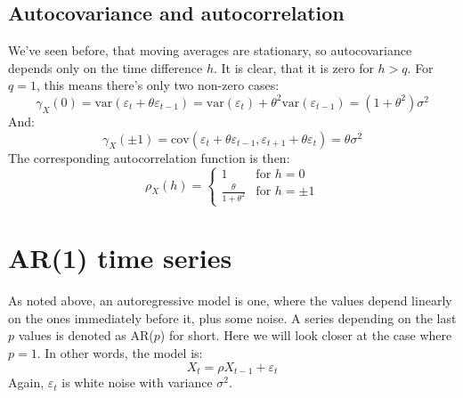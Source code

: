 \documentclass[12pt, a4paper]{article}
\numberwithin{equation}{section}
\begin{document}
\subsection{Autocovariance and autocorrelation}
We've seen before, that moving averages are stationary, so autocovariance depends only on the time difference $h$. It is clear, that it is zero for $h>q$. For $q=1$, this means there's only two non-zero cases:
\begin{equation}
\gamma_X(0)=\textrm{var}(\varepsilon_t+\theta\varepsilon_{t-1})=\textrm{var}(\varepsilon_t)+\theta^2\textrm{var}(\varepsilon_{t-1})=(1+\theta^2)\sigma^2
\end{equation}
And:
\begin{equation}
\gamma_X(\pm 1)=\textrm{cov}(\varepsilon_t+\theta\varepsilon_{t-1},\varepsilon_{t+1}+\theta\varepsilon_t)=\theta\sigma^2
\end{equation}
The corresponding autocorrelation function is then:
\begin{equation}
\rho_X(h)=
\begin{cases}
1 & \textrm{for }h=0 \\
\frac{\theta}{1+\theta^2} & \textrm{for }h=\pm 1
\end{cases}
\end{equation}


\section{AR(1) time series}
As noted above, an autoregressive model is one, where the values depend linearly on the ones immediately before it, plus some noise. A series depending on the last $p$ values is denoted as AR($p$) for short. Here we will look closer at the case where $p=1$. In other words, the model is:
\begin{equation}
X_t=\rho X_{t-1}+\varepsilon_t
\end{equation}
Again, $\varepsilon_t$ is white noise with variance $\sigma^2$.
\end{document}

